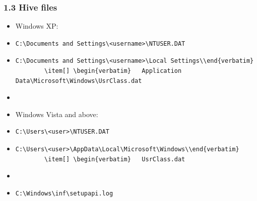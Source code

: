 \begin{frame}[fragile]
  \frametitle{1.3 Hive files}
    \begin{itemize}
        \item Windows XP:
        \item[] \begin{verbatim}C:\Documents and Settings\<username>\NTUSER.DAT\end{verbatim}
        \item[] \begin{verbatim}C:\Documents and Settings\<username>\Local Settings\\end{verbatim}
        \item[] \begin{verbatim}   Application Data\Microsoft\Windows\UsrClass.dat\end{verbatim}
        \item[]
        \item Windows Vista and above:
        \item[] \begin{verbatim}C:\Users\<user>\NTUSER.DAT\end{verbatim}
        \item[] \begin{verbatim}C:\Users\<user>\AppData\Local\Microsoft\Windows\\end{verbatim}
        \item[] \begin{verbatim}   UsrClass.dat\end{verbatim}
        \item[]
        \item \begin{verbatim}C:\Windows\inf\setupapi.log\end{verbatim}
    \end{itemize}
\end{frame}


